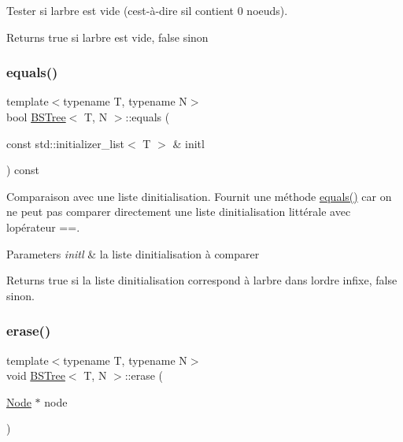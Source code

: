 Tester si l\textquotesingle{}arbre est vide (c\textquotesingle{}est-\/à-\/dire s\textquotesingle{}il contient 0 noeuds).

\begin{DoxyReturn}{Returns}
true si l\textquotesingle{}arbre est vide, false sinon 
\end{DoxyReturn}
\mbox{\label{classBSTree_a1228a7a210c99d7986eb74542e189c1f}} 
\subsubsection{\texorpdfstring{equals()}{equals()}}
{\footnotesize\ttfamily template$<$typename T, typename N$>$ \\
bool \hyperlink{classBSTree}{B\+S\+Tree}$<$ T, N $>$\+::equals (\begin{DoxyParamCaption}\item[{const std\+::initializer\+\_\+list$<$ T $>$ \&}]{initl }\end{DoxyParamCaption}) const\hspace{0.3cm}{\ttfamily [inline]}}

Comparaison avec une liste d\textquotesingle{}initialisation. Fournit une méthode \hyperlink{classBSTree_a1228a7a210c99d7986eb74542e189c1f}{equals()} car on ne peut pas comparer directement une liste d\textquotesingle{}initialisation littérale avec l\textquotesingle{}opérateur ==.


\begin{DoxyParams}{Parameters}
{\em initl} & la liste d\textquotesingle{}initialisation à comparer\\
\hline
\end{DoxyParams}
\begin{DoxyReturn}{Returns}
true si la liste d\textquotesingle{}initialisation correspond à l\textquotesingle{}arbre dans l\textquotesingle{}ordre infixe, false sinon. 
\end{DoxyReturn}
\mbox{\label{classBSTree_a52894175798373289d7e1c779d8ab5f9}} 
\subsubsection{\texorpdfstring{erase()}{erase()}}
{\footnotesize\ttfamily template$<$typename T, typename N$>$ \\
void \hyperlink{classBSTree}{B\+S\+Tree}$<$ T, N $>$\+::erase (\begin{DoxyParamCaption}\item[{\hyperlink{classBSTree_a9c1a06548b3ff425e1d906f17ce2c858}{Node} $\ast$}]{node }\end{DoxyParamCaption})\hspace{0.3cm}{\ttfamily [inline]}}

